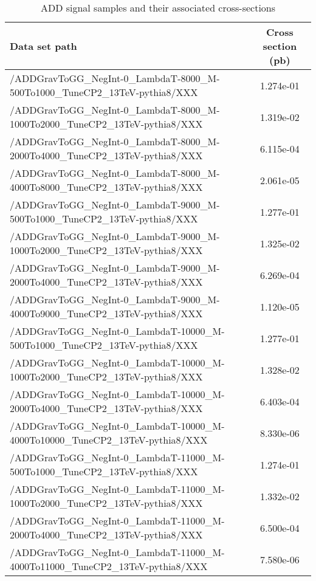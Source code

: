 \begin{landscape}
\begin{table}[!htbp]
       \caption{ ADD signal samples and their associated cross-sections }
       \centering
       \vspace{\baselineskip}
       \begin{tabular}{lc}
       \hline \hline
       Data set path & Cross section (pb)\\
       \hline

/ADDGravToGG\_NegInt-0\_LambdaT-8000\_M-500To1000\_TuneCP2\_13TeV-pythia8/XXX &  1.274e-01\\
/ADDGravToGG\_NegInt-0\_LambdaT-8000\_M-1000To2000\_TuneCP2\_13TeV-pythia8/XXX &  1.319e-02\\
/ADDGravToGG\_NegInt-0\_LambdaT-8000\_M-2000To4000\_TuneCP2\_13TeV-pythia8/XXX &  6.115e-04\\
/ADDGravToGG\_NegInt-0\_LambdaT-8000\_M-4000To8000\_TuneCP2\_13TeV-pythia8/XXX &  2.061e-05\\
/ADDGravToGG\_NegInt-0\_LambdaT-9000\_M-500To1000\_TuneCP2\_13TeV-pythia8/XXX &  1.277e-01\\
/ADDGravToGG\_NegInt-0\_LambdaT-9000\_M-1000To2000\_TuneCP2\_13TeV-pythia8/XXX &  1.325e-02\\
/ADDGravToGG\_NegInt-0\_LambdaT-9000\_M-2000To4000\_TuneCP2\_13TeV-pythia8/XXX &  6.269e-04\\
/ADDGravToGG\_NegInt-0\_LambdaT-9000\_M-4000To9000\_TuneCP2\_13TeV-pythia8/XXX &  1.120e-05\\
/ADDGravToGG\_NegInt-0\_LambdaT-10000\_M-500To1000\_TuneCP2\_13TeV-pythia8/XXX &  1.277e-01\\
/ADDGravToGG\_NegInt-0\_LambdaT-10000\_M-1000To2000\_TuneCP2\_13TeV-pythia8/XXX &  1.328e-02\\
/ADDGravToGG\_NegInt-0\_LambdaT-10000\_M-2000To4000\_TuneCP2\_13TeV-pythia8/XXX &  6.403e-04\\
/ADDGravToGG\_NegInt-0\_LambdaT-10000\_M-4000To10000\_TuneCP2\_13TeV-pythia8/XXX &  8.330e-06\\
/ADDGravToGG\_NegInt-0\_LambdaT-11000\_M-500To1000\_TuneCP2\_13TeV-pythia8/XXX &  1.274e-01\\
/ADDGravToGG\_NegInt-0\_LambdaT-11000\_M-1000To2000\_TuneCP2\_13TeV-pythia8/XXX &  1.332e-02\\
/ADDGravToGG\_NegInt-0\_LambdaT-11000\_M-2000To4000\_TuneCP2\_13TeV-pythia8/XXX &  6.500e-04\\
/ADDGravToGG\_NegInt-0\_LambdaT-11000\_M-4000To11000\_TuneCP2\_13TeV-pythia8/XXX &  7.580e-06\\

\end{tabular}
\end{table}
\end{landscape}
